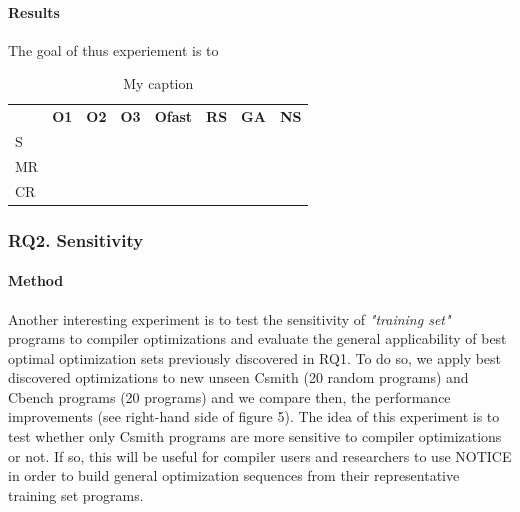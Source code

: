 \paragraph{Results}
The goal of thus experiement is to 



\begin{table}[h]
	\centering
	\caption{My caption}
	\label{my-label}
	\begin{tabular}{|l|l|l|l|l|l|l|c|}
		\hline
		& \textbf{O1}                    & \textbf{O2}                    & \textbf{O3}                    & \textbf{Ofast}                 & \textbf{RS}                    & \textbf{GA}                    & 
		\textbf{NS} \\
		\hhline{|=|=|=|=|=|=|=|=|}
		S  & \multicolumn{1}{c|}{} & \multicolumn{1}{c|}{} & \multicolumn{1}{c|}{} & \multicolumn{1}{c|}{} & \multicolumn{1}{c|}{} & \multicolumn{1}{c|}{} &    \\ \hline
		MR &                       &                       &                       &                       &                       &                       &    \\ \hline
		CR &                       &                       &                       &                       &                       &                       &    \\ \hline
	\end{tabular}
\end{table}


\noindent{}
\subsubsection{RQ2. Sensitivity}
\paragraph{Method}
Another interesting experiment is to test the sensitivity of \textit{"training set"} programs to compiler optimizations and evaluate the general applicability of best optimal optimization sets previously discovered in RQ1. To do so, we apply best discovered optimizations to new unseen Csmith (20 random programs) and Cbench programs (20 programs) and we compare then, the performance improvements (see right-hand side of figure 5). The idea of this experiment is to test whether only Csmith programs are more sensitive to compiler optimizations or not. If so, this will be useful for compiler users and researchers to use NOTICE in order to build general optimization sequences from their representative training set programs.

